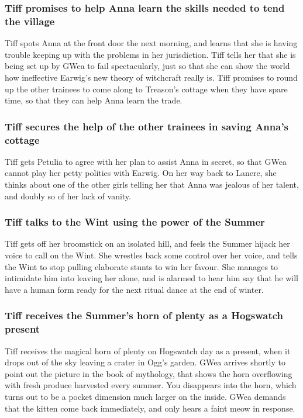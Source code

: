 \subsubsection{\Gls{Tiff} promises to help \Gls{Anna} learn the skills needed to tend the village}
\Gls{Tiff} spots \Gls{Anna} at the front door the next morning, and learns that she is having
trouble keeping up with the problems in her jurisdiction. \Gls{Tiff} tells her that she is being
set up by \Gls{GWea} to fail spectacularly, just so that she can show the world how ineffective
\Gls{Earwig}'s new theory of witchcraft really is. \Gls{Tiff} promises to round up the other
trainees to come along to \Gls{Treason}'s cottage when they have spare time, so that they can help
\Gls{Anna} learn the trade.

\subsubsection{\Gls{Tiff} secures the help of the other trainees in saving \Gls{Anna}'s cottage}
\Gls{Tiff} gets \Gls{Petulia} to agree with her plan to assist \Gls{Anna} in secret, so that
\Gls{GWea} cannot play her petty politics with \Gls{Earwig}. On her way back to Lancre, she thinks
about one of the other girls telling her that \Gls{Anna} was jealous of her talent, and doubly so
of her lack of vanity.

\subsubsection{\Gls{Tiff} talks to the \Gls{Wint} using the power of the \Gls{Summer}}
\Gls{Tiff} gets off her broomstick on an isolated hill, and feels the \Gls{Summer} hijack her voice
to call on the \Gls{Wint}. She wrestles back some control over her voice, and tells the \Gls{Wint}
to stop pulling elaborate stunts to win her favour. She manages to intimidate him into leaving her
alone, and is alarmed to hear him say that he will have a human form ready for the next ritual
dance at the end of winter.

\subsubsection{\Gls{Tiff} receives the \Gls{Summer}'s horn of plenty as a Hogswatch present}
\Gls{Tiff} receives the magical horn of plenty on Hogswatch day as a present, when it drops out of
the sky leaving a crater in \Gls{Ogg}'s garden. \Gls{GWea} arrives shortly to point out the picture
in the book of mythology, that shows the horn overflowing with fresh produce harvested every summer.
\Gls{You} disappears into the horn, which turns out to be a pocket dimension much larger on the
inside. \Gls{GWea} demands that the kitten come back immediately, and only hears a faint meow in
response.

